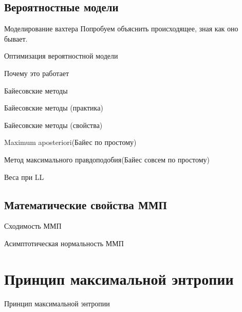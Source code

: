 \documentclass[14pt, fleqn, xcolor={dvipsnames, table}]{beamer}
\begin{document}
\subsection{Вероятностные модели}

\begin{frame}{Моделирование вахтера}
Попробуем объяснить происходящее, зная как оно бывает.
\end{frame}

\begin{frame}{Оптимизация вероятностной модели}
\end{frame}

\begin{frame}{Почему это работает} %
\end{frame}

\begin{frame}{Байесовские методы}
\end{frame}

\begin{frame}{Байесовские методы (практика)}
\end{frame}

\begin{frame}{Байесовские методы (свойства)}
\end{frame}

\begin{frame}{Maximum aposteriori}{(Байес по простому)}
\end{frame}

\begin{frame}{Метод максимального правдоподобия}{(Байес совсем по простому)}
\end{frame}

\begin{frame}{Веса при LL}
\end{frame}
\subsection{Математические свойства ММП}
\begin{frame}{Сходимость ММП}
\end{frame}
\begin{frame}{Асимптотическая нормальность ММП}
\end{frame}
\section{Принцип максимальной энтропии}

\begin{frame}{Принцип максимальной энтропии}
\end{frame}
\end{document}
